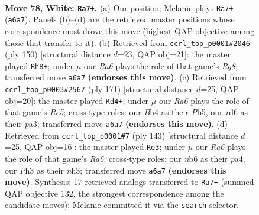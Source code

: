\documentclass[11pt]{article}
\begin{document}
\clearpage

\begin{figure}[p]\centering
\begin{subfigure}{0.46\textwidth}\centering
\resizebox{\linewidth}{!}{%
\newchessgame
\chessboard[
  setfen={8/6k1/Rn1r4/8/p4P1B/P6P/6K1/8 w - - 11 78},
  showmover=false,
  pgfstyle=straightmove, color=movearrow, markmove={a6-a7}
]}
\caption{}
\end{subfigure}\hfill
\begin{subfigure}{0.46\textwidth}\centering
\resizebox{\linewidth}{!}{%
\newchessgame
\chessboard[
  setfen={3B2R1/5pn1/4p2k/4P3/8/3K1P2/r7/8 w - - 15 76},
  showmover=false,
  pgfstyle=straightmove, color=movearrow, markmove={g8-h8}
]}
\caption{}
\end{subfigure}
\\[4pt]
\begin{subfigure}{0.46\textwidth}\centering
\resizebox{\linewidth}{!}{%
\newchessgame
\chessboard[
  setfen={8/8/1p1k4/1p6/1Nr4p/P6R/3K4/8 b - - 33 86},
  showmover=false,
  pgfstyle=straightmove, color=movearrow, markmove={c4-d4}
]}
\caption{}
\end{subfigure}\hfill
\begin{subfigure}{0.46\textwidth}\centering
\resizebox{\linewidth}{!}{%
\newchessgame
\chessboard[
  setfen={8/R4pk1/8/4P3/P6K/r6N/4b3/8 b - - 2 72},
  showmover=false,
  pgfstyle=straightmove, color=movearrow, markmove={a3-e3}
]}
\caption{}
\end{subfigure}
\caption{\textbf{Move 78, White: \texttt{Ra7+}.} (a) Our position; Melanie plays \texttt{Ra7+} (\texttt{a6a7}). Panels (b)--(d) are the retrieved master positions whose correspondence most drove this move (highest QAP objective among those that transfer to it). (b) Retrieved from \texttt{ccrl\_top\_p0001\#2046} (ply 150) [structural distance $d$=23, QAP obj=21]: the master played \texttt{Rh8+}; under $\mu$ our \emph{Ra6} plays the role of that game's \emph{Rg8}; transferred move \texttt{a6a7} \textbf{(endorses this move)}. (c) Retrieved from \texttt{ccrl\_top\_p0003\#2567} (ply 171) [structural distance $d$=25, QAP obj=20]: the master played \texttt{Rd4+}; under $\mu$ our \emph{Ra6} plays the role of that game's \emph{Rc5}; cross-type roles: our \emph{B}h4 as their \emph{P}b5, our \emph{r}d6 as their \emph{p}a3; transferred move \texttt{a6a7} \textbf{(endorses this move)}. (d) Retrieved from \texttt{ccrl\_top\_p0001\#7} (ply 143) [structural distance $d$=25, QAP obj=16]: the master played \texttt{Re3}; under $\mu$ our \emph{Ra6} plays the role of that game's \emph{Ra6}; cross-type roles: our \emph{n}b6 as their \emph{p}a4, our \emph{P}h3 as their \emph{n}h3; transferred move \texttt{a6a7} \textbf{(endorses this move)}. Synthesis: 17 retrieved analogs transferred to \texttt{Ra7+} (summed QAP objective 132, the strongest correspondence among the candidate moves); Melanie committed it via the \texttt{search} selector.}
\label{fig:thought-m154}
\end{figure}
\end{document}
